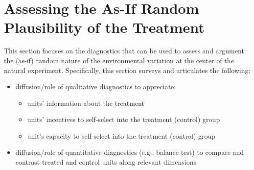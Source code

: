 \documentclass[11pt, english]{article}
\begin{document}
\section{Assessing the As-If Random Plausibility of the Treatment}

\noindent This section focuses on the diagnostics that can be used to assess and
argument the (as-if) random nature of the environmental variation at the center
of the natural experiment. Specifically, this section surveys and articulates the
following:

\begin{itemize}
    \item diffusion/role of qualitative diagnostics to appreciate:
        \begin{itemize}
            \item units' information about the treatment
            \item units' incentives to self-select into the treatment (control)
                group
            \item unit's capacity to self-select into the treatment (control)
                group
        \end{itemize}
    \item diffusion/role of quantitative diagnostics (e.g., balance test) to 
        compare and contrast treated and control units along relevant dimensions
\end{itemize}

%
%
%
%
%
%
%
%
%
%
%
%
%
\end{document}
